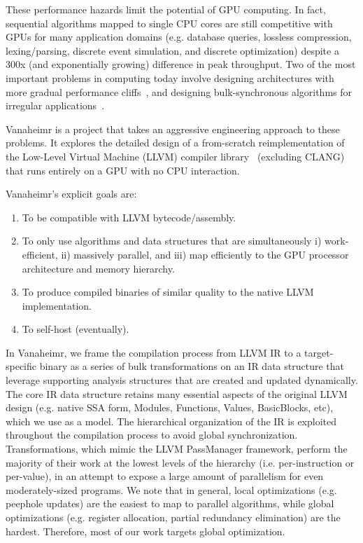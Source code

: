 \documentclass[conference, 10pt]{IEEEtran}
\begin{document}
These performance hazards limit the potential of GPU computing. In fact,
sequential algorithms mapped to single CPU cores are still competitive with GPUs
for many application domains (e.g. database queries, lossless compression,
lexing/parsing, discrete event simulation, and discrete optimization) despite a
300x (and exponentially growing) difference in peak throughput.  Two of the most
important problems in computing today involve designing architectures with more
gradual performance cliffs~\cite{ref:echelon}, and designing bulk-synchronous algorithms for irregular
applications~\cite{ref:irregular-applications}.  

Vanaheimr is a project that takes an aggressive engineering approach to these
problems. It explores the detailed design of a from-scratch reimplementation of
the Low-Level Virtual Machine (LLVM) compiler library~\cite{ref:llvm}
(excluding CLANG) that runs entirely on a GPU with no CPU interaction.  

Vanaheimr's explicit goals are: 

\begin{enumerate}
	\item To be compatible with LLVM bytecode/assembly.
	\item To only use algorithms and data structures that are simultaneously
	      i) work-efficient, ii) massively parallel, and iii) map efficiently to
	      the GPU processor architecture and memory hierarchy.
	\item To produce compiled binaries of similar quality to the native LLVM
	      implementation.
	\item To self-host (eventually).
\end{enumerate}

In Vanaheimr, we frame the compilation process from LLVM IR to a
target-specific binary as a series of bulk transformations on an IR data
structure that leverage supporting analysis structures that are created and
updated dynamically.  The core IR data structure retains many essential aspects
of  the original LLVM design (e.g. native SSA form, Modules, Functions, Values,
BasicBlocks, etc), which we use as a model.  The hierarchical organization of
the IR is exploited throughout the compilation process to avoid global
synchronization.  Transformations, which mimic the LLVM PassManager framework,
perform the majority
of their work at the lowest levels of the hierarchy (i.e. per-instruction or
per-value), in an attempt to expose a large amount of parallelism for even
moderately-sized programs.  We note that in general, local optimizations
(e.g. peephole updates) are the easiest to map to parallel algorithms, while
global optimizations (e.g. register allocation, partial redundancy elimination)
are the hardest.  Therefore, most of our work targets global optimization.
\end{document}
